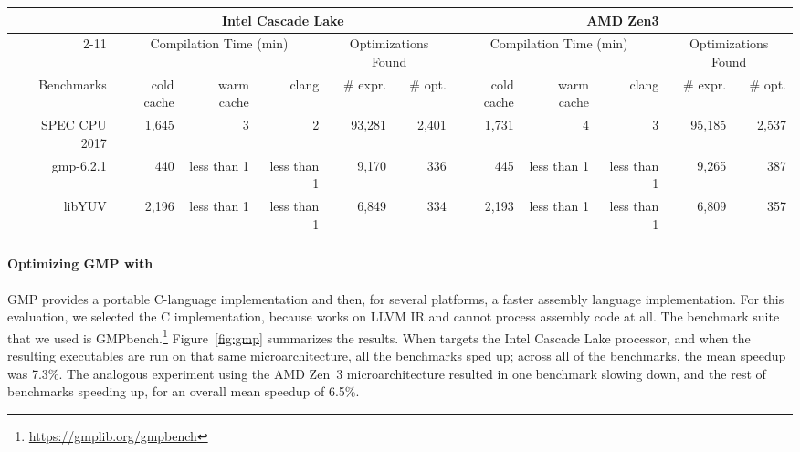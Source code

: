 \begin{table*}[t]
  \centering
  \scriptsize
  \begin{tabular}{| r | r r  r | r r | r r r | r r |}
    \hline
    \multirow{2}{*}{}& \multicolumn{5}{c|}{Intel Cascade Lake} & \multicolumn{5}{c|}{AMD Zen3} \\
    \cline{2-11}
    & \multicolumn{3}{c|}{Compilation Time (min)} & \multicolumn{2}{c|}{Optimizations Found} & \multicolumn{3}{c|}{Compilation Time (min)} & \multicolumn{2}{c|}{Optimizations Found}  \\
    \hline
    Benchmarks & cold cache & warm cache & clang & \# expr. & \# opt. & cold cache & warm cache & clang & \# expr. & \# opt. \\
    \hline\hline
    SPEC CPU 2017 & 1,645 & 3 & 2 & 93,281 & 2,401 & 1,731 & 4 & 3 & 95,185 & 2,537\\
    \hline
    gmp-6.2.1 & 440 & less than 1 & less than 1 & 9,170 & 336 & 445 & less than 1 & less than 1 & 9,265 & 387\\
    \hline
    libYUV & 2,196 & less than 1 & less than 1 & 6,849 & 334  & 2,193 & less than 1 & less than 1 & 6,809 & 357 \\
    \hline
  \end{tabular}
  \caption{Compile-time statistics}
  \label{tab:compiletime}
\end{table*}


\paragraph{Optimizing GMP with \tool{}}

\begin{figure*}[tbp]
  \centering
  \hfill
  \caption{GNU Multiple Precision Library (GMP) speedups}
  \label{fig:gmp}
\end{figure*}


GMP provides a portable C-language implementation and then, for
several platforms, a faster assembly language implementation.
%
For this evaluation, we selected the C implementation, because \tool{}
works on LLVM IR and cannot process assembly code at all.
%
The benchmark suite that we used is
GMPbench.\footnote{\url{https://gmplib.org/gmpbench}}
%
Figure~\ref{fig:gmp} summarizes the results.
%
When \tool{} targets the Intel Cascade Lake processor, and when the
resulting executables are run on that same microarchitecture,
all the benchmarks sped up;
across all of the benchmarks, the mean speedup was 7.3\%.
%
The analogous experiment using the AMD Zen~3 microarchitecture
resulted in one benchmark slowing down, and the rest of benchmarks
speeding up, for an overall mean speedup of 6.5\%.


